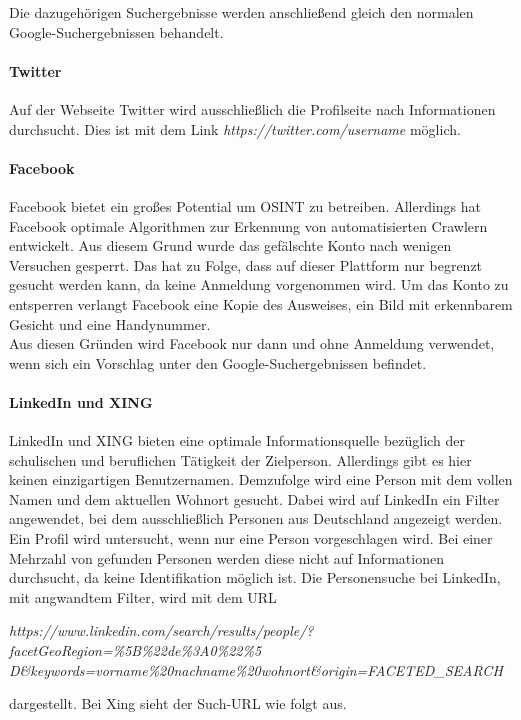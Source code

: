 			Die dazugehörigen Suchergebnisse werden anschließend gleich den normalen Google-Suchergebnissen behandelt.
			
			\paragraph{Twitter}
			Auf der Webseite Twitter wird ausschließlich die Profilseite nach Informationen durchsucht. Dies ist mit dem Link \textit{https://twitter.com/username} möglich.
			
			\paragraph{Facebook}
			Facebook bietet ein großes Potential um OSINT zu betreiben. Allerdings hat Facebook optimale Algorithmen zur Erkennung von automatisierten Crawlern entwickelt. Aus diesem Grund wurde das gefälschte Konto nach wenigen Versuchen gesperrt. Das hat zu Folge, dass auf dieser Plattform nur begrenzt gesucht werden kann, da keine Anmeldung vorgenommen wird. Um das Konto zu entsperren verlangt Facebook eine Kopie des Ausweises, ein Bild mit erkennbarem Gesicht und eine Handynummer.\\
			Aus diesen Gründen wird Facebook nur dann und ohne Anmeldung verwendet, wenn sich ein Vorschlag unter den Google-Suchergebnissen befindet.

			\paragraph{LinkedIn und XING}
			LinkedIn und XING bieten eine optimale Informationsquelle bezüglich der schulischen und beruflichen Tätigkeit der Zielperson. Allerdings gibt es hier keinen einzigartigen Benutzernamen. Demzufolge wird eine Person mit dem vollen Namen und dem aktuellen Wohnort gesucht. Dabei wird auf LinkedIn ein Filter angewendet, bei dem ausschließlich Personen aus Deutschland angezeigt werden. Ein Profil wird untersucht, wenn nur eine Person vorgeschlagen wird. Bei einer Mehrzahl von gefunden Personen werden diese nicht auf Informationen durchsucht, da keine Identifikation möglich ist.
			Die Personensuche bei LinkedIn, mit angwandtem Filter, wird mit dem URL
			
			\textit{https://www.linkedin.com/search/results/people/?facetGeoRegion=\%5B\%22de\%3A0\%22\%5\\D\&keywords=vorname\%20nachname\%20wohnort\&origin=FACETED\_SEARCH} 
			
			dargestellt. Bei Xing sieht der Such-URL wie folgt aus.
						
